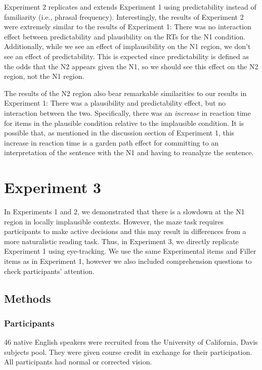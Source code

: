 \documentclass[
  12pt,
  letterpaper,
]{scrreprt}
\begin{document}
Experiment 2 replicates and extends Experiment 1 using predictability
instead of familiarity (i.e., phrasal frequency). Interestingly, the
results of Experiment 2 were extremely similar to the results of
Experiment 1: There was no interaction effect between predictability and
plausibility on the RTs for the N1 condition. Additionally, while we see
an effect of implausibility on the N1 region, we don't see an effect of
predictability. This is expected since predictability is defined as the
odds that the N2 appears given the N1, so we should see this effect on
the N2 region, not the N1 region.

The results of the N2 region also bear remarkable similarities to our
results in Experiment 1: There was a plausibility and predictability
effect, but no interaction between the two. Specifically, there was an
\emph{increase} in reaction time for items in the plausible condition
relative to the implausible condition. It is possible that, as mentioned
in the discussion section of Experiment 1, this increase in reaction
time is a garden path effect for committing to an interpretation of the
sentence with the N1 and having to reanalyze the sentence.

\section{Experiment 3}\label{experiment-3}

In Experiments 1 and 2, we demonstrated that there is a slowdown at the
N1 region in locally implausible contexts. However, the maze task
requires participants to make active decisions and this may result in
differences from a more naturalistic reading task. Thus, in Experiment
3, we directly replicate Experiment 1 using eye-tracking. We use the
same Experimental items and Filler items as in Experiment 1, however we
also included comprehension questions to check participants' attention.

\subsection{Methods}\label{methods-2}

\subsubsection{Participants}\label{participants-2}

46 native English speakers were recruited from the University of
California, Davis subjects pool. They were given course credit in
exchange for their participation. All participants had normal or
corrected vision.
\end{document}
